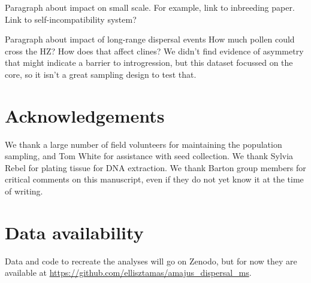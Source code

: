 \documentclass[10pt, a4paper, twocolumn]{article} %
\begin{document}
Paragraph about impact on small scale.
For example, link to inbreeding paper.
Link to self-incompatibility system?

Paragraph about impact of long-range dispersal events
How much pollen could cross the HZ?
How does that affect clines?
We didn't find evidence of asymmetry that might indicate a barrier to introgression, but this dataset focussed on the core, so it isn't a great sampling design to test that.

\section{Acknowledgements}

We thank a large number of field volunteers for maintaining the population sampling, and Tom White for assistance with seed collection. We thank Sylvia Rebel for plating tissue for DNA extraction.
We thank Barton group members for critical comments on this manuscript, even if they do not yet know it at the time of writing.

\section{Data availability}

Data and code to recreate the analyses will go on Zenodo, but for now they are available at \url{https://github.com/ellisztamas/amajus_dispersal_ms}.


\printbibliography[title={Bibliography}] %

\end{document}
